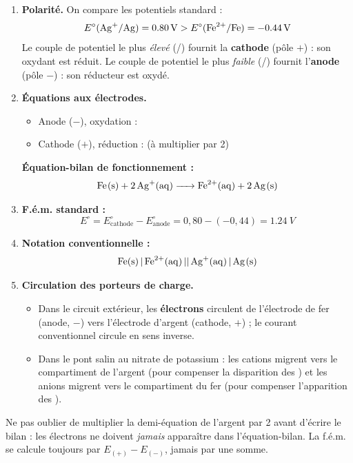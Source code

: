 \documentclass[11pt]{article}
\newcounter{popsec}
\newcounter{popsub}
\newcommand{\courssub}[1]{%
  \stepcounter{popsub}%
  \par\vspace{9pt}\noindent{\popxbold\fontsize{11.5}{13}\selectfont\color{popink}{\color{poporange}\thepopsec.\thepopsub}\hspace{6pt}#1}\par\nopagebreak\vspace{4pt}
}
\begin{document}
\courssub{Je m'entraîne}

\begin{corrige}
\begin{enumerate}
\item \textbf{Polarité.} On compare les potentiels standard :
\[ E^{\circ}(\ce{Ag+}/\ce{Ag}) = \SI{+0,80}{V} > E^{\circ}(\ce{Fe^2+}/\ce{Fe}) = \SI{-0,44}{V} \]
Le couple de potentiel le plus \emph{élevé} (/) fournit la \textbf{cathode} (pôle $+$) : son oxydant  est réduit. Le couple de potentiel le plus \emph{faible} (/) fournit l'\textbf{anode} (pôle $-$) : son réducteur  est oxydé.
\item \textbf{Équations aux électrodes.}
\begin{itemize}
\item Anode ($-$), oxydation : 
\item Cathode ($+$), réduction :  \quad (à multiplier par 2)
\end{itemize}
\textbf{Équation-bilan de fonctionnement :}
\[ \ce{Fe(s) + 2Ag+(aq) -> Fe^2+(aq) + 2Ag(s)} \]
\item \textbf{F.é.m. standard :}
\[ E^{\circ} = E^{\circ}_{\text{cathode}} - E^{\circ}_{\text{anode}} = 0,80 - (-0,44) = \SI{+1,24}{V} \]
\item \textbf{Notation conventionnelle :}
\[ \ce{Fe(s) | Fe^2+(aq) || Ag+(aq) | Ag(s)} \]
\item \textbf{Circulation des porteurs de charge.}
\begin{itemize}
\item Dans le circuit extérieur, les \textbf{électrons} circulent de l'électrode de fer (anode, $-$) vers l'électrode d'argent (cathode, $+$) ; le courant conventionnel circule en sens inverse.
\item Dans le pont salin au nitrate de potassium : les cations  migrent vers le compartiment de l'argent (pour compenser la disparition des ) et les anions  migrent vers le compartiment du fer (pour compenser l'apparition des ).
\end{itemize}
\end{enumerate}
\begin{attention}
Ne pas oublier de multiplier la demi-équation de l'argent par 2 avant d'écrire le bilan : les électrons ne doivent \emph{jamais} apparaître dans l'équation-bilan. La f.é.m. se calcule toujours par $E_{(+)} - E_{(-)}$, jamais par une somme.
\end{attention}
\end{corrige}
\end{document}
